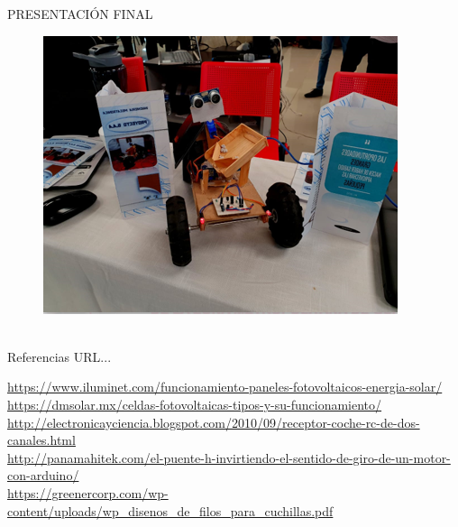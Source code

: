 \documentclass[11pt,a4paper]{article}
\begin{document}
\begin{center}
\pagebreak
PRESENTACIÓN FINAL
\end{center}
\begin{figure}[hbtp]
\centering
\includegraphics[scale=0.50]{portada.png}
\end{figure} 
\pagebreak

\begin{thebibliography}
 \\Referencias URL...
\end{thebibliography}
\url {https://www.iluminet.com/funcionamiento-paneles-fotovoltaicos-energia-solar/}\\
\url{https://dmsolar.mx/celdas-fotovoltaicas-tipos-y-su-funcionamiento/}\\
\url{http://electronicayciencia.blogspot.com/2010/09/receptor-coche-rc-de-dos-canales.html}
\\
\url{http://panamahitek.com/el-puente-h-invirtiendo-el-sentido-de-giro-de-un-motor-con-arduino/}\\
\url{https://greenercorp.com/wp-content/uploads/wp_disenos_de_filos_para_cuchillas.pdf}
\end{document}
